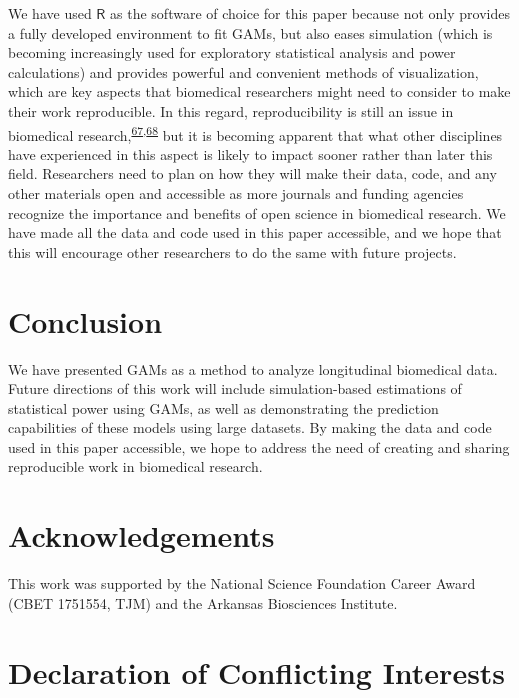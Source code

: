 \documentclass[
]{article}
\begin{document}
We have used \(\textsf{R}\) as the software of choice for this paper because not only provides a fully developed environment to fit GAMs, but also eases simulation (which is becoming increasingly used for exploratory statistical analysis and power calculations) and provides powerful and convenient methods of visualization, which are key aspects that biomedical researchers might need to consider to make their work reproducible. In this regard, reproducibility is still an issue in biomedical research,\textsuperscript{\protect\hyperlink{ref-begley2015}{67},\protect\hyperlink{ref-weissgerber2018}{68}} but it is becoming apparent that what other disciplines have experienced in this aspect is likely to impact sooner rather than later this field. Researchers need to plan on how they will make their data, code, and any other materials open and accessible as more journals and funding agencies recognize the importance and benefits of open science in biomedical research. We have made all the data and code used in this paper accessible, and we hope that this will encourage other researchers to do the same with future projects.

\hypertarget{conclusion}{%
\section{Conclusion}\label{conclusion}}

We have presented GAMs as a method to analyze longitudinal biomedical data. Future directions of this work will include simulation-based estimations of statistical power using GAMs, as well as demonstrating the prediction capabilities of these models using large datasets.
By making the data and code used in this paper accessible, we hope to address the need of creating and sharing reproducible work in biomedical research.

\hypertarget{acknowledgements}{%
\section{Acknowledgements}\label{acknowledgements}}

This work was supported by the National Science Foundation Career Award (CBET 1751554, TJM) and the Arkansas Biosciences Institute.

\hypertarget{declaration-of-conflicting-interests}{%
\section{Declaration of Conflicting Interests}\label{declaration-of-conflicting-interests}}
\end{document}
